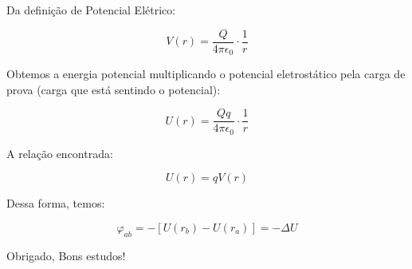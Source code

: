 \documentclass[a4paper, 12pt]{article}
\begin{document}
Da definição de Potencial Elétrico:

$$V(r) = \dfrac{Q}{4\pi\epsilon_{0}} \cdot \dfrac{1}{r}$$

Obtemos a energia potencial multiplicando o potencial
eletrostático pela carga de prova (carga que está sentindo o potencial):

$$U(r) = \dfrac{Qq}{4\pi\epsilon_{0}} \cdot \dfrac{1}{r}$$

A relação encontrada:

$$U(r) = qV(r)$$

Dessa forma, temos:

$$\varphi_{ab} = - [U(r_b) - U(r_a)] = - \Delta U$$

\begin{flushright}
Obrigado, Bons estudos!
\end{flushright}
	
\end{document}
